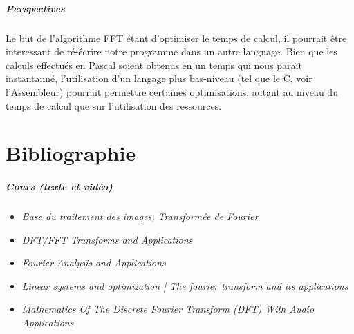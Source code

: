 \documentclass{report}
\begin{document}
	\paragraph{Perspectives}
	Le but de l'algorithme FFT étant d'optimiser le temps de calcul, il pourrait être interessant de ré-écrire notre programme dans un autre language. Bien que les calculs effectués en Pascal soient obtenus en un temps qui nous paraît instantanné, l'utilisation d'un langage plus bas-niveau (tel que le C, voir l'Assembleur) pourrait permettre certaines optimisations, autant au niveau du temps de calcul que sur l'utilisation des ressources.




	\chapter{Bibliographie}
	\paragraph{Cours (texte et vidéo)}
	\begin{itemize}
	
		\item \emph{Base du traitement des images, Transformée de Fourier}
		
		\item \emph{DFT/FFT Transforms and Applications}

		\item \emph{Fourier Analysis and Applications}\newline
		[\url{http://ocw.nctu.edu.tw/course_detail.php?bgid=1&gid=1&nid=13#.UMqWVjkkWQs}]
		
		\item \emph{Linear systems and optimization | The fourier transform and its applications}\newline
		[\url{http://see.stanford.edu/see/lecturelist.aspx?coll=84d174c2-d74f-493d-92ae-c3f45c0ee091}]

		\item \emph{Mathematics Of The Discrete Fourier Transform (DFT) With Audio Applications}
		
	\end{itemize}
\end{document}
